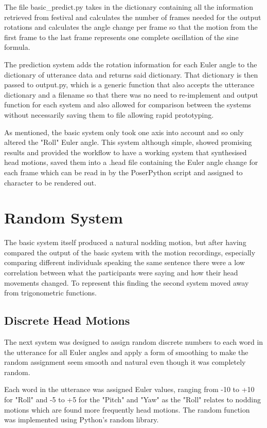 \documentclass[bsc,frontabs,twoside,singlespacing,parskip]{infthesis}
\begin{document}
The file basic\_predict.py takes in the dictionary containing all the information retrieved from festival and calculates the number of frames needed for the output rotations and calculates the angle change per frame so that the motion from the first frame to the last frame represents one complete oscillation of the sine formula.

The prediction system adds the rotation information for each Euler angle to the dictionary of utterance data and returns said dictionary. That dictionary is then passed to output.py, which is a generic function that also accepts the utterance dictionary and a filename so that there was no need to re-implement and output function for each system and also allowed for comparison between the systems without necessarily saving them to file allowing rapid prototyping.

As mentioned, the basic system only took one axis into account and so only altered the "Roll" Euler angle. This system although simple, showed promising results and provided the workflow to have a working system that synthesised head motions, saved them into a .head file containing the Euler angle change for each frame which can be read in by the PoserPython script and assigned to character to be rendered out.

\section{Random System}

The basic system itself produced a natural nodding motion, but after having compared the output of the basic system with the motion recordings, especially comparing different individuals speaking the same sentence there were a low correlation between what the participants were saying and how their head movements changed. To represent this finding the second system moved away from trigonometric functions.

\subsection{Discrete Head Motions}

The next system was designed to assign random discrete numbers to each word in the utterance for all Euler angles and apply a form of smoothing to make the random assignment seem smooth and natural even though it was completely random. 

Each word in the utterance was assigned Euler values, ranging from -10 to +10 for "Roll" and -5 to +5 for the "Pitch" and "Yaw" as the "Roll" relates to nodding motions which are found more frequently head motions. The random function was implemented using Python's random library.
\end{document}
